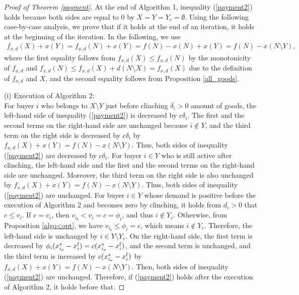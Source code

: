 \documentclass[letterpaper,11pt]{article}
\begin{document}
	\begin{proof}[Proof of Theorem \ref{payment}]
	At the end of Algorithm 1, inequality (\ref{payment2})
	holds because both sides are equal to $0$ by $X=Y=Y_c=\emptyset$.
	Using the following case-by-case analysis, 
	we prove that if it holds at the end of an iteration, it holds at the beginning of the iteration.
	In the following, we use 
	\begin{align*}
	f_{x,d}(X)+x(Y)=f_{x,d}(N)+x(Y)=f(N)-x(N)+x(Y)=f(N)-x(N\setminus Y),
	\end{align*}
	where the first equality follows from $f_{x,d}(X)\leq f_{x,d}(N)$ by the monotonicity of $f_{x,d}$
	and $f_{x,d}(N)\leq f_{x,d}(X)+d(N\setminus X)=f_{x,d}(X)$ due to the definition of $f_{x,d}$ and $X$, 
	and the second equality follows from Proposition \ref{all_goods}.
	
	\noindent(i) Execution of Algorithm 2:\\
	For buyer $i$ who belongs to $X\setminus Y$ just before clinching $\delta_i>0$ amount of goods, 
	the left-hand side of inequality (\ref{payment2}) is decreased by $c\delta_i$.
	The first and the second terms on the right-hand side are unchanged because $i\notin Y$, and
	the third term on the right side is decreased by $c\delta_i$ 
	by $f_{x,d}(X)+x(Y)=f(N)-x(N\setminus Y)$.
	Thus, both sides of inequality (\ref{payment2}) are decreased by $c\delta_i$.
	For buyer $i\in Y$ who is still active after clinching, 
	the left-hand side and the first and the second terms on the right-hand side are unchanged.
	Moreover, the third term on the right side is also unchanged by $f_{x,d}(X)+x(Y)=f(N)-x(N\setminus Y)$.
	Thus, both sides of inequality (\ref{payment2}) are unchanged.
	For buyer $i\in Y$ whose demand is positive before the execution of Algorithm 2 and becomes zero by clinching, 
	it holds from $d_i>0$ that $c\leq v_i$.
	If $c=v_i$, then $v_{i_b}< v_i=c=\phi_i$, and thus $i\notin Y_c$.
	Otherwise, from Proposition \ref{algo<opt}, we have $v_{i_b}\leq \phi_i=c$, 
	which means $i\notin Y_c$.
	Therefore, the left-hand side is unchanged by $i\in Y\setminus Y_c$.
	On the right-hand side, the first term is decreased by $\phi_i (x^*_{i_a}-x^{\rm f}_i)=c(x^*_{i_a}-x^{\rm f}_i)$, 
	and the second term is unchanged, 
	and the third term is increased by $c(x^*_{i_a}-x^{\rm f}_i)$ by $f_{x,d}(X)+x(Y)=f(N)-x(N\setminus Y)$.
	Then, both sides of inequality (\ref{payment2}) are unchanged. 
	Therefore, if (\ref{payment2}) holds after the execution of Algorithm 2, 
	it holds before that.
	

\end{proof}
\end{document}
